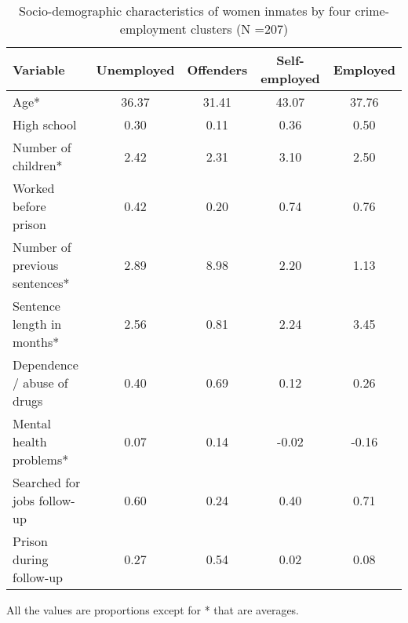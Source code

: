 \begin{table}[htp]
\footnotesize
\setlength{\tabcolsep}{10pt}
\renewcommand{\arraystretch}{1.3}
\begin{threeparttable}
\centering
\caption{Socio-demographic characteristics of women inmates \newline by four crime-employment clusters (N =207)} 
\label{tab:descriptives_job_crime_4}
\begin{tabular}{lcccc}
  \hline
Variable & Unemployed & Offenders & Self-employed & Employed \\ 
  \hline
Age* & 36.37 & 31.41 & 43.07 & 37.76 \\ 
  High school & 0.30 & 0.11 & 0.36 & 0.50 \\ 
  Number of children* & 2.42 & 2.31 & 3.10 & 2.50 \\ 
  Worked before prison & 0.42 & 0.20 & 0.74 & 0.76 \\ 
  Number of previous sentences* & 2.89 & 8.98 & 2.20 & 1.13 \\ 
  Sentence length in months* & 2.56 & 0.81 & 2.24 & 3.45 \\ 
  Dependence / abuse of drugs & 0.40 & 0.69 & 0.12 & 0.26 \\ 
  Mental health problems* & 0.07 & 0.14 & -0.02 & -0.16 \\ 
  Searched for jobs follow-up & 0.60 & 0.24 & 0.40 & 0.71 \\ 
  Prison during follow-up & 0.27 & 0.54 & 0.02 & 0.08 \\ 
   \hline
\end{tabular}
\begin{tablenotes}
\scriptsize
\item All the values are proportions except for * that are averages.
\end{tablenotes}
\end{threeparttable}
\end{table}
